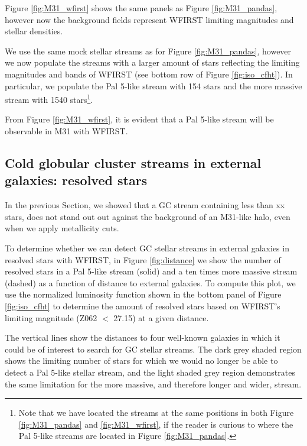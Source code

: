 \documentclass[twocolumn]{aastex62}
\begin{document}
Figure \ref{fig:M31_wfirst} shows the same panels as Figure \ref{fig:M31_pandas}, however now the background fields represent WFIRST limiting magnitudes and stellar densities.

We use the same mock stellar streams as for Figure \ref{fig:M31_pandas}, however we now populate the streams with a larger amount of stars reflecting the limiting magnitudes and bands of WFIRST (see bottom row of Figure \ref{fig:iso_cfht}). In particular, we populate the Pal 5-like stream with 154 stars and the more massive stream with 1540 stars\footnote{Note that we have located the streams at the same positions in both Figure \ref{fig:M31_pandas} and \ref{fig:M31_wfirst}, if the reader is curious to where the Pal 5-like streams are located in Figure  \ref{fig:M31_pandas}.}.

From Figure \ref{fig:M31_wfirst}, it is evident that a Pal 5-like stream will be observable in M31 with WFIRST. 



\subsection{Cold globular cluster streams in external galaxies: resolved stars}
\label{sec:resother}
In the previous Section, we showed that a GC stream containing less than xx stars, does not stand out out against the background of an M31-like halo, even when we apply metallicity cuts. 

To determine whether we can detect GC stellar streams in external galaxies in resolved stars with WFIRST, in Figure \ref{fig:distance} we show the number of resolved stars in a Pal 5-like stream (solid) and a ten times more massive stream (dashed) as a function of distance to external galaxies. To compute this plot, we use the normalized luminosity function shown in the bottom panel of Figure \ref{fig:iso_cfht} to determine the amount of resolved stars based on WFIRST's limiting magnitude (Z062 $<$ 27.15) at a given distance.

The vertical lines show the distances to four well-known galaxies in which it could be of interest to search for GC stellar streams. The dark grey shaded region shows the limiting number of stars for which we would no longer be able to detect a Pal 5-like stellar stream, and the light shaded grey region demonstrates the same limitation for the more massive, and therefore longer and wider, stream. 
\end{document}
